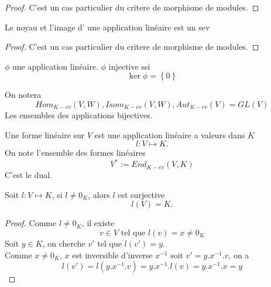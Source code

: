 \documentclass[../main.tex]{subfiles}
\begin{document}
\begin{proof}
C'est un cas particulier du critere de morphisme de modules.
\end{proof}
\begin{propo}
Le noyau et l'image d' une application linéaire est un sev
\end{propo}
\begin{proof}
C'est un cas particulier du critere de morphisme de modules.
\end{proof}
\begin{propo}
$\phi$ une application linéaire. $\phi$ injective ssi
\[ 
\ker \phi = \left\{ 0 \right\} 
\]
\end{propo}
\begin{defn}[Notations]
On notera
\[ 
	Hom_{K-ev} ( V,W), Isom_{K-ev } ( V,W), Aut_{K-ev } ( V)= GL(V)
\]
Les ensembles des applications bijectives.
\end{defn}

\begin{defn}
Une forme linéaire sur $V$ est une application linéaire a valeurs dans $K$ 
\[ 
l: V\mapsto K.
\]
On note l'ensemble des formes linéaires
\[ 
	V^{*} := End_{K-ev } ( V,K)
\]
C'est le dual.
\end{defn}
\begin{propo}
Soit $l:V \mapsto K$, si $l\neq 0_K$, alors $l$ est surjective
\[ 
	l(V)=K.
\]

\end{propo}
\begin{proof}
Comme $l\neq 0_K$, il existe 
\[ 
	v\in V \text{ tel que } l(v)=x \neq 0_K
\]
Soit $y\in K$, on cherche $v'$ tel que $l(v')=y$.\\
Comme $x\neq 0_K$, $x$ est inversible d'inverse
$ x^{-1} $
soit $v'= y.x^{-1}.v$, on a
\[ 
	l(v')=l(y.x^{-1}.v) = y.x^{-1}.l(v)= y.x^{-1}.x=y
\]


\end{proof}
\end{document}
